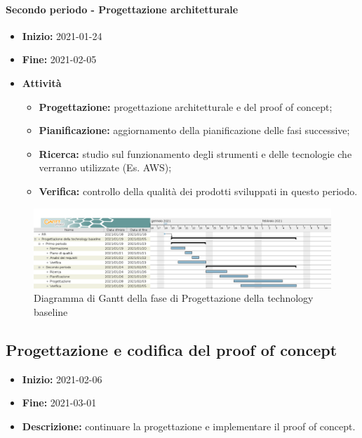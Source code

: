 \paragraph[Secondo periodo]{Secondo periodo - \textnormal{Progettazione architetturale}}
\begin{itemize}
    \item [] \textbf{Inizio:} 2021-01-24
    \item [] \textbf{Fine:} 2021-02-05
    \item [] \textbf{Attività}
          \begin{itemize}
              \item \textbf{Progettazione:} progettazione architetturale e del proof of concept;
              \item \textbf{Pianificazione:} aggiornamento della pianificazione delle fasi successive;
              \item \textbf{Ricerca:} studio sul funzionamento degli strumenti e delle tecnologie che verranno utilizzate (Es. AWS);
              \item \textbf{Verifica:} controllo della qualità dei prodotti sviluppati in questo periodo.
          \end{itemize}
\end{itemize}

\begin{figure}[H]
    \centering
    \includegraphics[width=1\linewidth]{res/images/pianificazione/progettazione_della_technology_baseline.png}
    \caption{Diagramma di Gantt della fase di Progettazione della technology baseline}
    \label{fig:_Gantt progettazione della technology baseline}
\end{figure}


\subsection{Progettazione e codifica del proof of concept} \label{_pianificazioneCodificaPoC}
\begin{itemize}
    \item []\textbf{Inizio:} 2021-02-06
    \item []\textbf{Fine:} 2021-03-01
    \item []\textbf{Descrizione:} continuare la progettazione e implementare il proof of concept.
\end{itemize}

